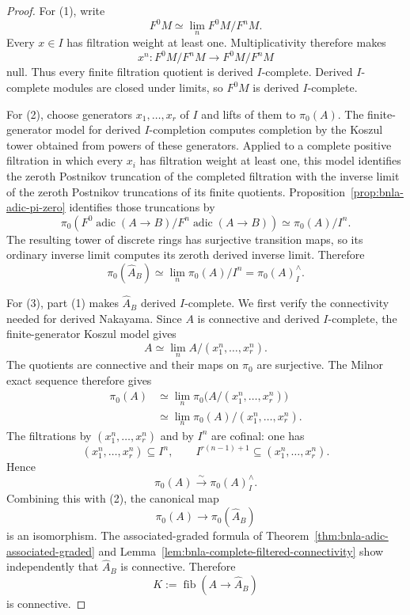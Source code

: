 \begin{proof}
For (1), write
\[
    F^0M\simeq\lim_n F^0M/F^nM.
\]
Every $x\in I$ has filtration weight at least one.  Multiplicativity therefore
makes
\[
    x^n:
    F^0M/F^nM
    \longrightarrow
    F^0M/F^nM
\]
null.  Thus every finite filtration quotient is derived $I$-complete.
Derived $I$-complete modules are closed under limits, so $F^0M$ is derived
$I$-complete.

For (2), choose generators $x_1,\ldots,x_r$ of $I$ and lifts of them to
$\pi_0(A)$.  The finite-generator model for derived $I$-completion computes
completion by the Koszul tower obtained from powers of these generators.
Applied to a complete positive filtration in which every $x_i$ has filtration
weight at least one, this model identifies the zeroth Postnikov truncation of
the completed filtration with the inverse limit of the zeroth Postnikov
truncations of its finite quotients.  Proposition~\ref{prop:bnla-adic-pi-zero}
identifies those truncations by
\[
    \pi_0\left(
        F^0\operatorname{adic}(A\to B)/
        F^n\operatorname{adic}(A\to B)
    \right)
    \simeq
    \pi_0(A)/I^n.
\]
The resulting tower of discrete rings has surjective transition maps, so its
ordinary inverse limit computes its zeroth derived inverse limit.  Therefore
\[
    \pi_0(\widehat A_B)
    \simeq
    \lim_n\pi_0(A)/I^n
    =
    \pi_0(A)^\wedge_I.
\]

For (3), part (1) makes $\widehat A_B$ derived $I$-complete.  We first verify
the connectivity needed for derived Nakayama.  Since $A$ is connective and
derived $I$-complete, the finite-generator Koszul model gives
\[
    A
    \simeq
    \lim_n A/(x_1^n,\ldots,x_r^n).
\]
The quotients are connective and their maps on $\pi_0$ are surjective.  The
Milnor exact sequence therefore gives
\[
\begin{aligned}
    \pi_0(A)
    &\simeq
    \lim_n
    \pi_0\bigl(A/(x_1^n,\ldots,x_r^n)\bigr)\\
    &\simeq
    \lim_n
    \pi_0(A)/(x_1^n,\ldots,x_r^n).
\end{aligned}
\]
The filtrations by $(x_1^n,\ldots,x_r^n)$ and by $I^n$ are cofinal: one has
\[
    (x_1^n,\ldots,x_r^n)\subseteq I^n,
    \qquad
    I^{r(n-1)+1}\subseteq(x_1^n,\ldots,x_r^n).
\]
Hence
\[
    \pi_0(A)
    \xrightarrow{\sim}
    \pi_0(A)^\wedge_I.
\]
Combining this with (2), the canonical map
\[
    \pi_0(A)\longrightarrow\pi_0(\widehat A_B)
\]
is an isomorphism.  The associated-graded formula of
Theorem~\ref{thm:bnla-adic-associated-graded} and
Lemma~\ref{lem:bnla-complete-filtered-connectivity} show independently that
$\widehat A_B$ is connective.  Therefore
\[
    K:=\operatorname{fib}(A\to\widehat A_B)
\]
is connective.


\end{proof}
